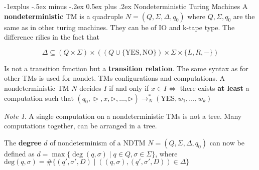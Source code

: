 \documentclass[10pt,landscape]{article}
\makeatletter
\newcommand{\bumper}{\triangleright}
\newcommand{\YES}{\mathrm{YES}}
\newcommand{\NO}{\mathrm{NO}}
\renewcommand{\iff}{\Leftrightarrow}
\theoremstyle{plain}%
\theoremstyle{definition}
\theoremstyle{remark}
\newtheorem*{note}{Note}
\renewcommand{\subsection}{\@startsection{subsection}{2}{0mm}%
                                {-1explus -.5ex minus -.2ex}%
                                {0.5ex plus .2ex}%
                                {\normalfont\normalsize\bfseries}}
\makeatother
\begin{document}
\begin{multicols}{4}
\subsection{Nondeterministic Turing Machines}
A \textbf{nondeterministic} TM is a quadruple $N = (Q, \Sigma, \Delta, q_0)$ where
$Q, \Sigma, q_0$ are the same as in other turing machines. They can be of IO and k-tape type.
The difference rilies in the fact that 

\[ \Delta \subseteq (Q \times \Sigma) \times ((Q \cup \{\YES, \NO\}) \times \Sigma \times \{L,R, -\}) \]

Is not a transition function but a \textbf{transition relation}.
The same syntax as for other TMs is used for nondet. TMs configurations and computations.
A nondeterministic TM $N$ decides $I$ if and only if $x \in I \iff $ there exists \textbf{at least} a computation 
such that $(q_0, \underline{\bumper}, x, \bumper, \hdots, \bumper) \to^*_N (\YES, w_1, \hdots, w_k)$

\begin{note}
    A single computation on a nondeterministic TMs is not a tree.
    Many computations together, can be arranged in a tree.
\end{note}

The \textbf{degree} $d$ of nondeterminism of a NDTM $N = (Q, \Sigma, \Delta, q_0)$ can now be defined as
$d = \max\{ \deg{(q,\sigma)} \mid q \in Q, \sigma \in \Sigma\}$, where 
$\text{deg}(q, \sigma) = \#\{(q', \sigma', D) \mid ((q, \sigma), (q', \sigma', D)) \in \Delta\}$


\end{multicols}
\end{document}
